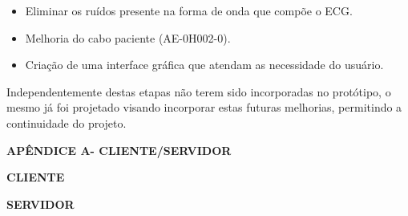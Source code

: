 \documentclass[12pt, a4paper]{article}
\begin{document}
\begin{itemize}
\item Eliminar os ruídos presente na forma de onda que compõe o ECG.
\item Melhoria do cabo paciente (AE-0H002-0).
\item Criação de uma interface gráfica que atendam as necessidade do usuário.
\end{itemize}

Independentemente destas etapas não terem sido incorporadas no protótipo, o mesmo já foi projetado visando incorporar estas futuras melhorias, permitindo a continuidade do projeto.

\newpage


%
\providecommand*{\refname}{}
\renewcommand*{\refname}{\begin{center}\textbf{REFERÊNCIAS}\end{center}}

\newpage
\vspace*{4cm}

\pagestyle{empty}
\pagestyle{myheadings}

%



\newpage
\begin{center}
\textbf{APÊNDICE A-  CLIENTE/SERVIDOR}



\textbf{CLIENTE}




\newpage
\textbf{SERVIDOR}



\end{center}
\end{document}
